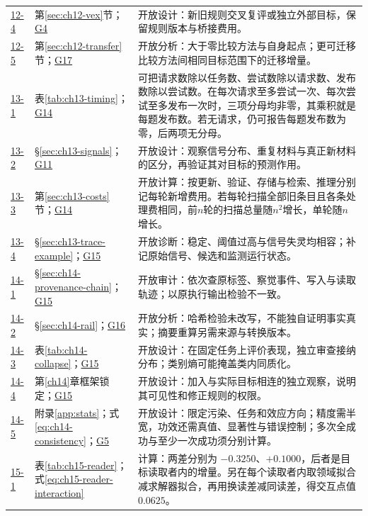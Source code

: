 \begin{small}
\begin{longtable}{@{}p{1.1cm}p{4.1cm}p{10.1cm}@{}}
\hyperref[ex:ch12-4]{12-4} & 第\ref{sec:ch12-vex}节；\hyperref[sol:g04]{G4} & 开放设计：新旧规则交叉复评或独立外部目标，保留规则版本与桥接费用。 \\
\hyperref[ex:ch12-5]{12-5} & 第\ref{sec:ch12-transfer}节；\hyperref[sol:g17]{G17} & 开放分析：大于零比较方法与自身起点；更可迁移比较方法间相同目标范围下的迁移增量。 \\
\hyperref[ex:ch13-1]{13-1} & 表\ref{tab:ch13-timing}；\hyperref[sol:g14]{G14} & 可把请求数除以任务数、尝试数除以请求数、发布数除以尝试数。在每次请求至多尝试一次、每次尝试至多发布一次时，三项分母均非零，其乘积就是每题发布数。若无请求，仍可报告每题发布数为零，后两项无分母。 \\
\hyperref[ex:ch13-2]{13-2} & \S\ref{sec:ch13-signals}；\hyperref[sol:g11]{G11} & 开放设计：观察信号分布、重复材料与真正新材料的区分，再验证其对目标的预测作用。 \\
\hyperref[ex:ch13-3]{13-3} & 第\ref{sec:ch13-costs}节；\hyperref[sol:g14]{G14} & 开放计算：按更新、验证、存储与检索、推理分别记每轮新增费用。若每轮扫描全部旧条目且各条处理费相同，前$n$轮的扫描总量随$n^2$增长，单轮随$n$增长。 \\
\hyperref[ex:ch13-4]{13-4} & \S\ref{sec:ch13-trace-example}；\hyperref[sol:g15]{G15} & 开放诊断：稳定、阈值过高与信号失灵均相容；补记原始信号、候选和监测运行状态。 \\
\hyperref[ex:ch14-1]{14-1} & \S\ref{sec:ch14-provenance-chain}；\hyperref[sol:g15]{G15} & 开放审计：依次查原标签、察觉事件、写入与读取轨迹；以原执行输出检验不一致。 \\
\hyperref[ex:ch14-2]{14-2} & \S\ref{sec:ch14-rail}；\hyperref[sol:g16]{G16} & 开放分析：哈希检验未改写，不能独自证明事实真实；摘要重算另需来源与转换版本。 \\
\hyperref[ex:ch14-3]{14-3} & 表\ref{tab:ch14-collapse}；\hyperref[sol:g15]{G15} & 开放设计：在固定任务上评价表现，独立审查接纳分布；类别熵可能掩盖类内同质化。 \\
\hyperref[ex:ch14-4]{14-4} & 第\ref{ch14}章框架锁定；\hyperref[sol:g15]{G15} & 开放设计：加入与实际目标相连的独立观察，说明其可见性和修正规则的权限。 \\
\hyperref[ex:ch14-5]{14-5} & 附录\ref{app:stats}；式\ref{eq:ch14-consistency}；\hyperref[sol:g05]{G5} & 开放设计：限定污染、任务和效应方向；精度需半宽，功效还需真值、显著性与错误控制；多次全成功与至少一次成功须分别计算。 \\
\hyperref[ex:ch15-1]{15-1} & 表\ref{tab:ch15-reader}；式\eqref{eq:ch15-reader-interaction} & 计算：两差分别为 $-0.3250$、$+0.1000$，后者是目标读取者内的增量。另在每个读取者内取领域拟合减求解器拟合，再用换读差减同读差，得交互点值 $0.0625$。 \\

\end{longtable}
\end{small}
